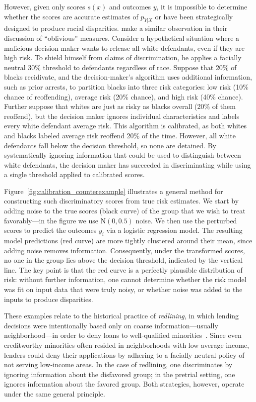 \documentclass[sigconf]{acmart}
\begin{document}
However, given only scores $s(x)$ and outcomes $y$, it is impossible to determine whether the scores are accurate estimates of $p_{Y|X}$ or have been strategically designed to produce racial disparities. \citet{hardt2016} make a similar observation in their discussion of ``oblivious'' measures.
Consider a hypothetical situation where a malicious decision maker wants to release all white defendants, even if they are high risk. 
To shield himself from claims of discrimination, he applies a facially neutral 30\% threshold to defendants regardless of race. 
Suppose that 20\% of blacks recidivate, and the decision-maker's algorithm uses additional information, such as prior arrests, to partition blacks into three risk categories: low risk (10\% chance of reoffending), average risk (20\% chance), and high risk (40\% chance). 
Further suppose that whites are just as risky as blacks overall (20\% of them reoffend), but the decision maker ignores individual characteristics and labels every white defendant average risk. This algorithm is calibrated, as both whites and blacks labeled average risk reoffend 20\% of the time. 
However, all white defendants fall below the decision threshold, so none are detained. 
By systematically ignoring information that could be used to distinguish between white defendants, 
the decision maker has succeeded in discriminating while using a single threshold applied to calibrated scores.

Figure~\ref{fig:calibration_counterexample} illustrates a general method for constructing such discriminatory scores
from true risk estimates.
We start by adding noise to the true scores (black curve) of the group that we wish to treat favorably---in the figure we use $\text{N}(0, 0.5)$ noise.
We then use the perturbed scores to predict the outcomes $y_i$ via a logistic regression model.
The resulting model predictions (red curve) are more tightly clustered around their mean, 
since adding noise removes information. 
Consequently, under the transformed scores, no one in the group lies above the decision threshold, indicated by the vertical line.
The key point is that the red curve is a perfectly plausible distribution of risk: without further information, 
one cannot determine whether the risk model was fit on 
input data that were truly noisy, 
or whether noise was added to the inputs to produce disparities.

These examples relate to the historical practice of \emph{redlining}, in which lending decisions were intentionally based only on 
coarse information---usually neighborhood---in order to deny loans to well-qualified minorities~\cite{berkovec1994race}.
Since even creditworthy minorities often resided 
in neighborhoods with low average income,
lenders could deny their applications by adhering to a facially neutral policy of not serving low-income areas.
In the case of redlining, one discriminates by
ignoring information about the disfavored group;
in the pretrial setting, one ignores information about the favored group. Both strategies, however, operate under the same general principle.
\end{document}
